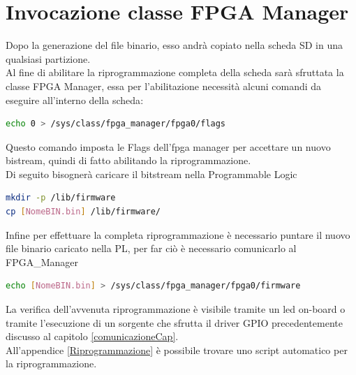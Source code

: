 \section{Invocazione classe FPGA Manager}
Dopo la generazione del file binario, esso andrà copiato nella scheda SD in una qualsiasi partizione.\\
Al fine di abilitare la riprogrammazione completa della scheda sarà sfruttata la classe FPGA Manager, essa per l'abilitazione necessità alcuni comandi da eseguire all'interno della scheda\cite{PL}:
\begin{lstlisting}[language=sh, label=lst:C, caption={Abilitazione FPGA\_manager}]
echo 0 > /sys/class/fpga_manager/fpga0/flags
\end{lstlisting}
Questo comando imposta le Flags dell'fpga manager per accettare un nuovo bistream, quindi di fatto abilitando la riprogrammazione.\\
Di seguito bisognerà caricare il bitstream nella Programmable Logic
\begin{lstlisting}[language=sh, label=lst:C, caption={Caricamento bitstream nella Programmable Logic}]
mkdir -p /lib/firmware
cp [NomeBIN.bin] /lib/firmware/
\end{lstlisting}
Infine per effettuare la completa riprogrammazione è necessario puntare il nuovo file binario caricato nella PL, per far ciò è necessario comunicarlo al FPGA\_Manager
\begin{lstlisting}[language=sh, label=lst:C, caption={Comunicazione nuovo bitstream alla PL}]
echo [NomeBIN.bin] > /sys/class/fpga_manager/fpga0/firmware
\end{lstlisting}
La verifica dell'avvenuta riprogrammazione è visibile tramite un led on-board o tramite l'esecuzione di un sorgente che sfrutta il driver GPIO precedentemente discusso al capitolo \ref{comunicazioneCap}.\\
All'appendice \ref{Riprogrammazione} è possibile trovare uno script automatico per la riprogrammazione.

